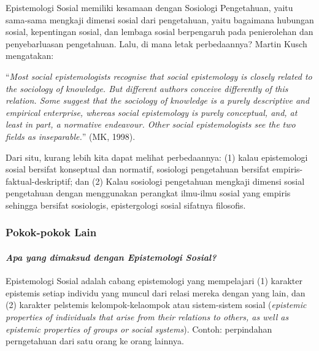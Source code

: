 \documentclass[10pt,a4paper]{article}
\renewenvironment{quote}
{\list{}{%
       \leftmargin 1.5em 
       \rightmargin 0em}
   \item\relax}
{\endlist}
\begin{document}
\begin{multicols}{2}
Epistemologi Sosial memiliki kesamaan dengan Sosiologi Pengetahuan,
yaitu sama-sama mengkaji dimensi sosial dari pengetahuan, yaitu
bagaimana hubungan sosial, kepentingan sosial, dan lembaga sosial
berpengaruh pada penierolehan dan penyebarluasan pengetahuan. Lalu, di
mana letak perbedaannya? Martin Kusch mengatakan:

\begin{quote}
``\emph{Most social epistemologists recognise that social epistemology
is closely related to the sociology of knowledge. But different authors
conceive differently of this relation. Some suggest that the sociology
of knowledge is a purely descriptive and empirical enterprise, whereas
social epistemology is purely conceptual, and, at least in part, a
normative endeavour. Other social epistemologists see the two fields as
inseparable.}'' (MK, 1998).
\end{quote}

Dari situ, kurang lebih kita dapat melihat perbedaannya: (1) kalau
epistemologi sosial bersifat konseptual dan normatif, sosiologi
pengetahuan bersifat empiris-faktual-deskriptif; dan (2) Kalau sosiologi
pengetahuan mengkaji dimensi sosial pengetahuan dengan menggunakan
perangkat ilmu-ilmu sosial yang empiris sehingga bersifat sosiologis,
epistergologi sosial sifatnya filosofis.

\hypertarget{pokok-pokok-lain-2}{%
\subsubsection{Pokok-pokok Lain}\label{pokok-pokok-lain-2}}

\hypertarget{apa-yang-dimaksud-dengan-epistemologi-sosial}{%
\paragraph{\texorpdfstring{\emph{Apa yang dimaksud dengan Epistemologi
Sosial?}}{Apa yang dimaksud dengan Epistemologi Sosial?}}\label{apa-yang-dimaksud-dengan-epistemologi-sosial}}

Epistemologi Sosial adalah cabang epistemologi yang mempelajari (1)
karakter epistemis setiap individu yang muncul dari relasi mereka dengan
yang lain, dan (2) karakter pelstemis kelompok-kelaompok atau
sistem-sistem sosial (\emph{epistemic properties of individuals that
arise from their relations to others, as well as epistemic properties of
groups or social systems}). Contoh: perpindahan perngetahuan dari satu
orang ke orang lainnya.


\end{multicols}
\end{document}
